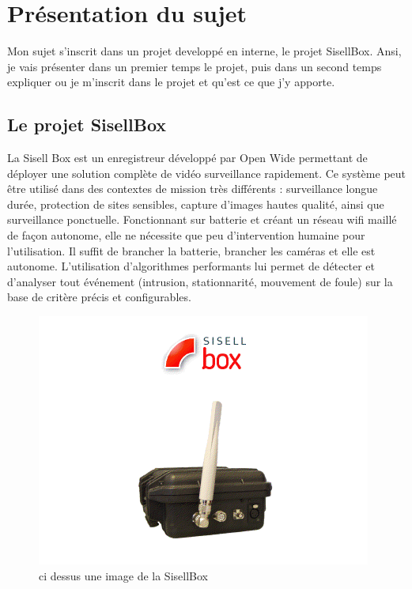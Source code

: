 \chapter{Présentation du sujet}
Mon sujet s'inscrit dans un projet developpé en interne, le projet SisellBox. Ansi,
je vais présenter dans un premier temps le projet, puis dans un second temps
expliquer ou je m'inscrit dans le projet et qu'est ce que j'y apporte.

\section{Le projet SisellBox}
\label{sisselbox}
  La Sisell Box est un enregistreur développé par Open Wide permettant de déployer une solution complète de vidéo surveillance rapidement.
  Ce système peut être utilisé dans des contextes de mission très différents : surveillance longue durée, protection de sites sensibles, capture d'images hautes qualité, ainsi que surveillance ponctuelle.
  Fonctionnant sur batterie et créant un réseau wifi maillé de façon autonome, elle ne nécessite que peu d'intervention humaine pour l'utilisation. Il suffit de brancher la batterie, brancher les caméras et elle est autonome. L'utilisation d'algorithmes performants lui permet de détecter et d'analyser tout événement (intrusion, stationnarité, mouvement de foule) sur la base de critère précis et configurables.
\begin{figure}[!h]
  \centering
  \includegraphics{figures/sbox}
  \caption{ci dessus une image de la SisellBox}
\end{figure}
\newpage

